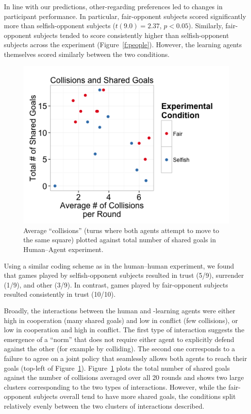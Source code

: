 \documentclass[letterpaper]{article}
\begin{document}
In line with our predictions, other-regarding preferences led to
changes in participant performance. In particular, fair-opponent
subjects scored significantly more than selfish-opponent subjects
($t(9.0) = 2.37$, $p < 0.05$). Similarly, fair-opponent subjects
tended to score consistently higher than selfish-opponent subjects
across the experiment (Figure~\ref{f:people}). However, the learning
agents themselves scored similarly between the two conditions. 


\begin{figure}
\centering
\includegraphics[width=0.8\columnwidth]{figures/human_v_agent_collisions_goals.png}
\caption{Average ``collisions'' (turns where both agents attempt to move to the same square) plotted against total number of shared goals in Human--Agent experiment.}
\label{f:collide}
\end{figure}

Using a similar coding scheme as in the human--human experiment, we
found that games played by selfish-opponent subjects resulted in trust
(5/9), surrender (1/9), and other (3/9). In contrast, games played by
fair-opponent subjects resulted consistently in trust (10/10).

Broadly, the interactions between the human and \Q-learning agents were either high
in cooperation (many shared goals) and low in conflict (few
collisions), or low in cooperation and high in conflict. The first
type of interaction suggests the emergence of a ``norm'' that does not
require either agent to explicitly defend against the other (for
example by colliding). The second one corresponds to a failure to
agree on a joint policy that seamlessly allows both agents to reach
their goals (top-left of Figure~\ref{f:collide}). Figure~\ref{f:collide} plots the total number of shared goals against the number of collisions averaged over all 20 rounds and
shows two large clusters corresponding to the two types of
interactions.  However, while the fair-opponent subjects overall tend
to have more shared goals, the conditions split relatively evenly
between the two clusters of interactions described.
\end{document}
